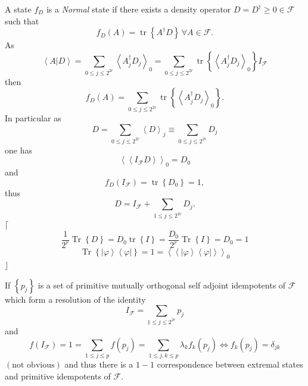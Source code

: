 \documentclass[aps,preprint]{revtex4}%
\begin{document}
A state $f_{D}$ is a \emph{Normal} state if there exists a density operator
$D=D^{\dagger}\geq0\in\mathcal{F}$ such that
\begin{equation}
f_{D}\left(  A\right)  =\operatorname*{tr}\left\{  A^{\dagger}D\right\}
\,\forall A\in\mathcal{F}.
\end{equation}
As%
\begin{equation}
\left\langle \left.  A\right\vert D\right\rangle =\sum_{0\leq j\leq2^{2r}%
}\left\langle A_{j}^{\dagger}D_{j}\right\rangle _{0}=\sum_{0\leq j\leq2^{2r}%
}\operatorname*{tr}\left\{  \left\langle A_{j}^{\dagger}D_{j}\right\rangle
_{0}\right\}  I_{\mathcal{F}}%
\end{equation}
then
\begin{equation}
f_{D}\left(  A\right)  =\sum_{0\leq j\leq2^{2r}}\operatorname*{tr}\left\{
\left\langle A_{j}^{\dagger}D_{j}\right\rangle _{0}\right\}  .
\end{equation}
In particular as
\begin{equation}
D=\sum_{0\leq j\leq2^{2r}}\left\langle D\right\rangle _{j}\equiv\sum_{0\leq
j\leq2^{2r}}D_{j}%
\end{equation}
one has%
\begin{equation}
\left\langle \left\langle I_{\mathcal{F}}D\right\rangle \right\rangle
_{0}=D_{0}%
\end{equation}
and
\begin{equation}
f_{D}\left(  I_{\mathcal{F}}\right)  =\operatorname*{tr}\left\{
D_{0}\right\}  =1,
\end{equation}
thus
\begin{equation}
D=I_{\mathcal{F}}+\sum_{1\leq j\leq2^{2r}}D_{j}.
\end{equation}
$\lceil$%
\begin{equation}
\frac{1}{2^{r}}\operatorname{Tr}\left\{  D\right\}  =D_{0}\operatorname*{tr}%
\left\{  I\right\}  =\frac{D_{0}}{2^{r}}\operatorname{Tr}\left\{  I\right\}
=D_{0}=1
\end{equation}%
\begin{equation}
\operatorname{Tr}\left\{  \left\vert \varphi\right\rangle \left\langle
\varphi\right\vert \right\}  =1=\left\langle \left\langle \left\vert
\varphi\right\rangle \left\langle \varphi\right\vert \right\rangle
\right\rangle _{0}%
\end{equation}
$\rfloor$

If $\left\{  p_{j}\right\}  $ is a set of primitive mutually orthogonal self
adjoint idempotents of $\mathcal{F}$ which form a resolution of the identity
\begin{equation}
I_{\mathcal{F}}=\sum_{1\leq j\leq2^{2r}}p_{j}%
\end{equation}
and
\begin{equation}
f\left(  I_{\mathcal{F}}\right)  =1=\sum_{1\leq j\leq p}f\left(  p_{j}\right)
=\sum_{1\leq j,k\leq p}\lambda_{k}f_{k}\left(  p_{j}\right)  \Leftrightarrow
f_{k}\left(  p_{j}\right)  =\delta_{jk}%
\end{equation}
$\left(  \text{not obvious}\right)  $ and thus there is a $1-1$ correspondence
between extremal states and primitive idempotents of $\mathcal{F}.$ 
\end{document}
